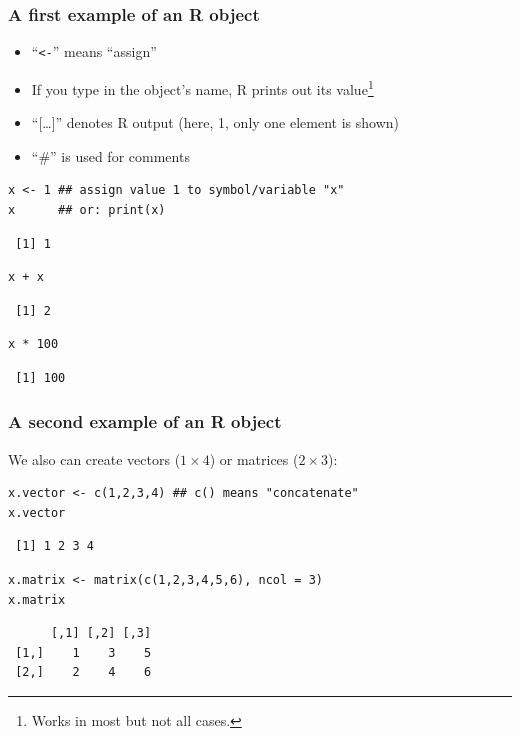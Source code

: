 \documentclass[bigger]{beamer}
\begin{document}
\begin{frame}[fragile]
\frametitle{A first example of an R object}
\label{sec-1-1-8}

\begin{itemize}
\item \enquote{\texttt{<-}} means \enquote{assign}
\item If you type in the object's name, R prints out its value\footnote{Works in most but not all cases.
 }
\item \enquote{[\ldots{}]} denotes R output (here, 1, only one element is shown)
\item \enquote{\#} is used for comments
\end{itemize}



\lstset{language=R}
\begin{lstlisting}
x <- 1 ## assign value 1 to symbol/variable "x"
x      ## or: print(x)
\end{lstlisting}

\begin{verbatim}
 [1] 1
\end{verbatim}


\lstset{language=R}
\begin{lstlisting}
x + x
\end{lstlisting}

\begin{verbatim}
 [1] 2
\end{verbatim}


\lstset{language=R}
\begin{lstlisting}
x * 100
\end{lstlisting}

\begin{verbatim}
 [1] 100
\end{verbatim}
\end{frame}
\begin{frame}[fragile]
\frametitle{A second example of an R object}
\label{sec-1-1-9}


    We also can create vectors ($1\times4$) or matrices ($2\times3$):
    

\lstset{language=R}
\begin{lstlisting}
x.vector <- c(1,2,3,4) ## c() means "concatenate" 
x.vector
\end{lstlisting}

\begin{verbatim}
 [1] 1 2 3 4
\end{verbatim}



\lstset{language=R}
\begin{lstlisting}
x.matrix <- matrix(c(1,2,3,4,5,6), ncol = 3)
x.matrix
\end{lstlisting}

\begin{verbatim}
      [,1] [,2] [,3]
 [1,]    1    3    5
 [2,]    2    4    6
\end{verbatim}
\end{frame}
\end{document}
